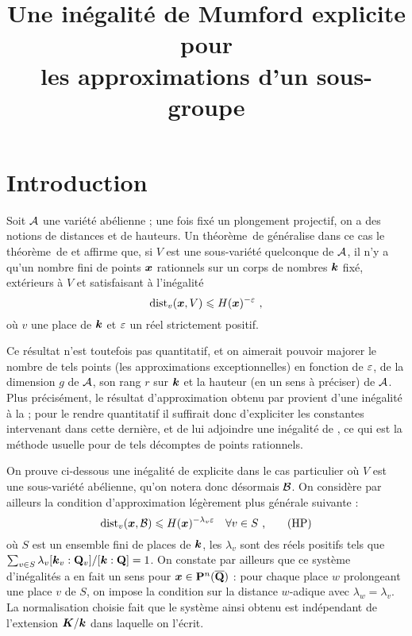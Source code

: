


\title{Une inégalité de Mumford explicite pour \\
  les approximations d'un sous-groupe}



\maketitle

\section*{Introduction}

Soit $\mathcal A$ une variété abélienne ; une fois fixé un plongement projectif, on a
des notions de distances et de hauteurs. Un théorème~de 
généralise dans ce cas le théorème~de  et affirme que, si $V$ est
une sous-variété quelconque de $\mathcal A$, il n'y a qu'un nombre fini de points
$\boldsymbol{x}$ rationnels sur un corps de nombres $\boldsymbol{k}$ fixé, extérieurs à $V$ et
satisfaisant à l'inégalité
\[
 \mathrm{dist}_v(\boldsymbol{x}, V) \leqslant H(\boldsymbol{x})^{-\varepsilon} \text{ ,}
\]
où $v$ une place de $\boldsymbol{k}$ et $\varepsilon$ un réel strictement positif.

Ce résultat n'est toutefois pas quantitatif, et on aimerait pouvoir majorer le
nombre de tels points (les approximations exceptionnelles) en fonction de
$\varepsilon$, de la dimension $g$ de $\mathcal A$, son rang $r$ sur $\boldsymbol{k}$ et la hauteur (en
un sens à préciser) de $\mathcal A$. Plus précisément, le résultat d'approximation
obtenu par  provient d'une inégalité à la  ; pour le
rendre quantitatif il suffirait donc d'expliciter les constantes intervenant
dans cette dernière, et de lui adjoindre une inégalité de , ce
qui est la méthode usuelle pour de tels décomptes de points rationnels.

On prouve ci-dessous une inégalité de  explicite dans le cas
particulier où $V$ est une sous-variété abélienne, qu'on notera donc désormais
$\mathcal B$. On considère par ailleurs la condition d'approximation légèrement plus
générale suivante :
\[
 \mathrm{dist}_v(\boldsymbol{x}, \mathcal B) \leqslant H(\boldsymbol{x})^{-\lambda_v\varepsilon} \quad \forall v \in S \text{ ,} \tag{HP} \label{HP}
\]
où $S$ est un ensemble fini de places de $\boldsymbol{k}$, les $\lambda_v$ sont des
réels positifs tels que $\sum_{v \in S} \lambda_v [\boldsymbol{k}_v : \mathbf{Q}_v]/[\boldsymbol{k} : \mathbf{Q}]
= 1$. On constate par ailleurs que ce système d'inégalités a en fait un sens
pour $\boldsymbol{x} \in \mathbf{P}^n(\overline{\mathbf{Q}})$ : pour chaque place $w$ prolongeant une place
$v$ de $S$, on impose la condition sur la distance $w$-adique avec $\lambda_w
= \lambda_v$. La normalisation choisie fait que le système ainsi obtenu est
indépendant de l'extension $\boldsymbol{K}/\boldsymbol{k}$ dans laquelle on l'écrit.

